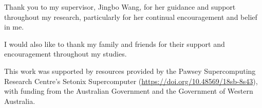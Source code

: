 Thank you to my supervisor, Jingbo Wang, for her guidance and support throughout my research, particularly for her continual encouragement and belief in me.

I would also like to thank my family and friends for their support and encouragement throughout my studies.

This work was supported by resources provided by the Pawsey Supercomputing Research Centre's Setonix Supercomputer (\url{https://doi.org/10.48569/18sb-8s43}), with funding from the Australian Government and the Government of Western Australia.
